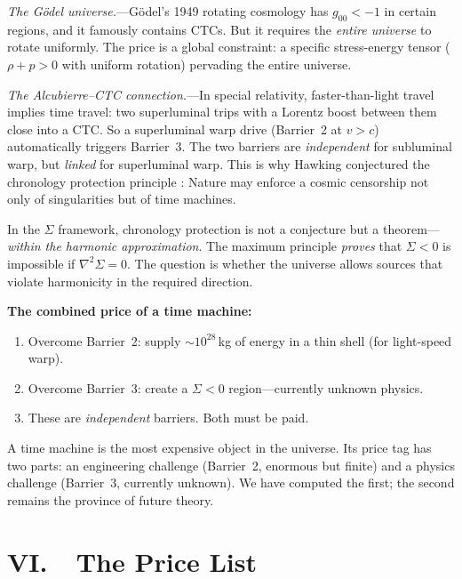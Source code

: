 \documentclass[12pt]{article}
\begin{document}
\emph{The G\"odel universe.}---G\"odel's 1949 rotating cosmology
\cite{Goedel1949} has $g_{00} < -1$ in certain regions, and it
famously contains CTCs. But it requires the \emph{entire universe} to
rotate uniformly. The price is a global constraint: a specific stress-energy tensor ($\rho + p > 0$ with uniform rotation) pervading the entire universe.

\emph{The Alcubierre--CTC connection.}---In special relativity,
faster-than-light travel implies time travel: two superluminal trips
with a Lorentz boost between them close into a CTC. So a superluminal
warp drive (Barrier~2 at $v > c$) automatically triggers Barrier~3.
The two barriers are \emph{independent} for subluminal warp, but
\emph{linked} for superluminal warp. This is why Hawking conjectured
the chronology protection principle \cite{Hawking1992}: Nature may
enforce a cosmic censorship not only of singularities but of time
machines.

In the $\Sigma$ framework, chronology protection is not a conjecture
but a theorem---\emph{within the harmonic approximation}. The maximum
principle \emph{proves} that $\Sigma < 0$ is impossible if
$\nabla^2\Sigma = 0$. The question is whether the universe allows
sources that violate harmonicity in the required direction.




\noindent\textbf{The combined price of a time machine:}
\begin{enumerate}
\item Overcome Barrier~2: supply ${\sim}10^{28}$\,kg of
energy in a thin shell (for light-speed warp).
\item Overcome Barrier~3: create a $\Sigma < 0$ region---currently
unknown physics.
\item These are \emph{independent} barriers. Both must be paid.
\end{enumerate}

A time machine is the most expensive object in the universe. Its price
tag has two parts: an engineering challenge (Barrier~2, enormous but
finite) and a physics challenge (Barrier~3, currently unknown). We have
computed the first; the second remains the province of future theory.


\section*{VI.\ \ The Price List}
\end{document}
